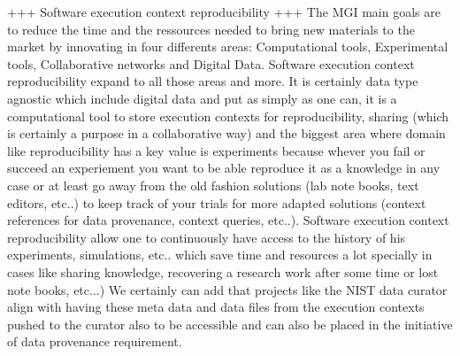 +++ Software execution context reproducibility +++
The MGI main goals are to reduce the time and the ressources needed to bring new materials to the market
by innovating in four differents areas: Computational tools, Experimental tools, Collaborative networks
and Digital Data. Software execution context reproducibility expand to all those areas and more. It is certainly data type agnostic
which include digital data and put as simply as one can, it is a computational tool to store execution contexts for
 reproducibility, sharing (which is certainly a purpose in a collaborative way) and the biggest area where domain like reproducibility
has a key value is experiments because whever you fail or succeed an experiement you want to be able reproduce
it as a knowledge in any case or at least go away from the old fashion solutions (lab note books, text editors, etc..)
to keep track of your trials for more adapted solutions (context references for data provenance, context queries, etc..). 
Software execution context reproducibility allow one to continuously have access to the history
of his experiments, simulations, etc.. which save time and resources a lot specially in cases like sharing knowledge,
recovering a research work after some time or lost note books, etc...)
We certainly can add that projects like the NIST data curator align with having these meta data and data files from the execution contexts pushed to the curator also to be accessible and can also be placed in the initiative of data provenance requirement.